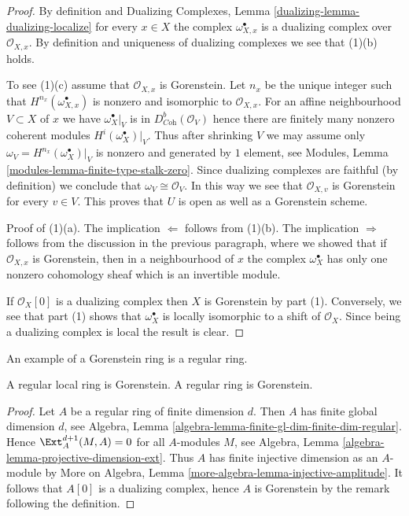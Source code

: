 \begin{proof}
By definition and Dualizing Complexes, Lemma
\ref{dualizing-lemma-dualizing-localize} for every $x \in X$
the complex $\omega_{X, x}^\bullet$ is a dualizing complex over
$\mathcal{O}_{X, x}$. By definition and uniqueness of dualizing
complexes we see that (1)(b) holds.

\medskip\noindent
To see (1)(c) assume that $\mathcal{O}_{X, x}$ is Gorenstein.
Let $n_x$ be the unique integer such that $H^{n_{x}}(\omega_{X, x}^\bullet)$
is nonzero and isomorphic to $\mathcal{O}_{X, x}$.
For an affine neighbourhood $V \subset X$
of $x$ we have $\omega_X^\bullet|_V$ is in $D^b_{\textit{Coh}}(\mathcal{O}_V)$
hence there are finitely many nonzero coherent modules
$H^i(\omega_X^\bullet)|_V$. Thus after shrinking $V$ we may assume
only $\omega_V = H^{n_x}(\omega_X^\bullet)|_V$
is nonzero and generated by $1$ element, see
Modules, Lemma \ref{modules-lemma-finite-type-stalk-zero}.
Since dualizing complexes are faithful (by definition)
we conclude that $\omega_V \cong \mathcal{O}_V$.
In this way we see that $\mathcal{O}_{X, v}$ is Gorenstein
for every $v \in V$. This proves that $U$ is open as well
as a Gorenstein scheme.

\medskip\noindent
Proof of (1)(a). The implication $\Leftarrow$ follows from (1)(b).
The implication $\Rightarrow$ follows from the discussion
in the previous paragraph, where we showed that if $\mathcal{O}_{X, x}$
is Gorenstein, then in a neighbourhood of $x$ the complex
$\omega_X^\bullet$ has only one nonzero cohomology sheaf
which is an invertible module.

\medskip\noindent
If $\mathcal{O}_X[0]$ is a dualizing complex then $X$ is Gorenstein by
part (1). Conversely, we see that part (1) shows that
$\omega_X^\bullet$ is locally isomorphic to a shift of $\mathcal{O}_X$.
Since being a dualizing complex is local the result is clear.
\end{proof}

\noindent
An example of a Gorenstein ring is a regular ring.

\begin{lemma}
\label{lemma-regular-gorenstein}
A regular local ring is Gorenstein.
A regular ring is Gorenstein.
\end{lemma}

\begin{proof}
Let $A$ be a regular ring of finite dimension $d$. Then $A$ has finite
global dimension $d$, see
Algebra, Lemma \ref{algebra-lemma-finite-gl-dim-finite-dim-regular}.
Hence $\Ext^{d + 1}_A(M, A) = 0$ for all $A$-modules $M$, see
Algebra, Lemma \ref{algebra-lemma-projective-dimension-ext}.
Thus $A$ has finite injective dimension as an $A$-module by
More on Algebra, Lemma \ref{more-algebra-lemma-injective-amplitude}.
It follows that $A[0]$ is a dualizing complex, hence $A$ is
Gorenstein by the remark following the definition.
\end{proof}

